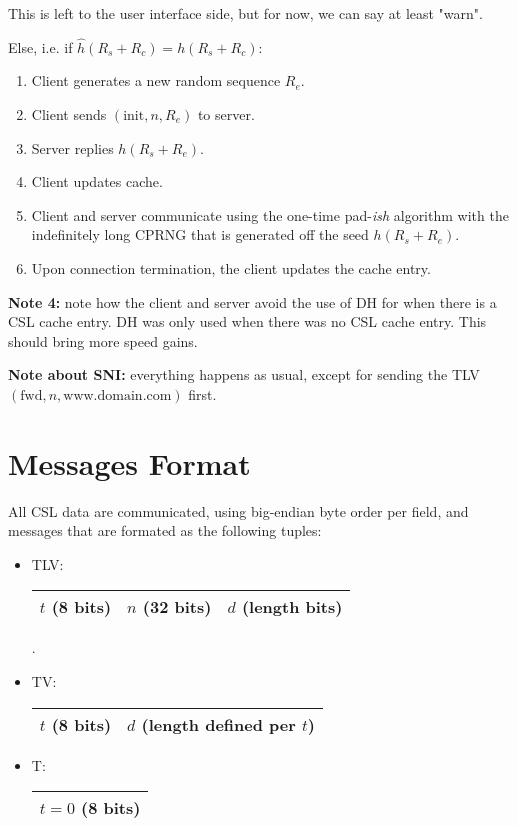 \documentclass{article}
\begin{document}
\begin{enumerate}
\begin{enumerate}
\begin{enumerate}
                This is left to the user interface side, but for now, we can
                say at least "warn".
            \end{enumerate}
        Else, i.e. if $\hat h(R_s + R_c) = h(R_s + R_c)$:
            \begin{enumerate}
                \item Client generates a new random sequence $R_e$.
                \item Client sends $(\text{init}, n, R_e)$ to server.
                \item Server replies $h(R_s + R_e)$.
                \item Client updates cache.
                \item Client and server communicate using the one-time
                pad-\emph{ish} algorithm with the indefinitely long CPRNG that
                is generated off the seed $h(R_s+R_e)$.
                \item Upon connection termination, the client updates the cache
                entry.
            \end{enumerate}
        \textbf{Note 4:} note how the client and server avoid the use of DH for
        when there is a CSL cache entry. DH was only used when there was no CSL
        cache entry. This should bring more speed gains.
    \end{enumerate}
\end{enumerate}

\textbf{Note about SNI:} everything happens as usual, except for sending the
TLV $(\text{fwd}, n, \text{www.domain.com})$ first.

\section{Messages Format}
All CSL data are communicated, using big-endian byte order per field, and
messages that are formated as the following tuples:
\begin{itemize}
    \item TLV:
        \begin{tabular}{|l|l|l|}\hline
            $t$ (8 bits) & $n$ (32 bits) & $d$ (length bits)\\\hline
        \end{tabular}.
    \item TV: 
        \begin{tabular}{|l|l|}\hline
            $t$ (8 bits) & $d$ (length defined per $t$)\\\hline
        \end{tabular}
    \item T: 
        \begin{tabular}{|l|}\hline
            $t=0$ (8 bits)\\\hline
        \end{tabular}
\end{itemize}
\end{document}
